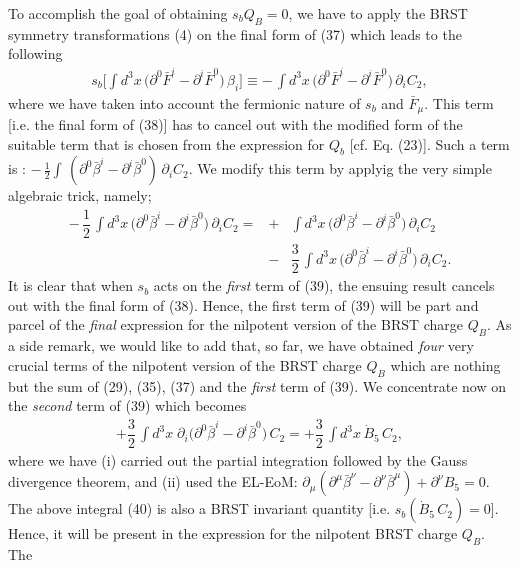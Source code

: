 \documentclass[12pt]{article}
\begin{document}
To accomplish the goal of obtaining $s_b Q_B = 0$, we have to apply the BRST symmetry transformations (4) on the final form of (37) which leads to
the following
\begin{eqnarray}\label{38} 
s_b \Big [\int d^3 x\, \big (\partial^0 \bar F^i - \partial^i \bar F^0 \big )\, \beta_i \Big ] \equiv
-\, \int d^3 x\, \big (\partial^0 \bar F^i - \partial^i \bar F^0 \big )\,\partial_i C_2,
\end{eqnarray}
where we have taken into account the fermionic nature of $s_b$ and $\bar F_\mu$. This term [i.e. the final form of (38)] has to cancel out
with the modified form of the suitable term that is chosen from the expression for $Q_b$ [cf. Eq. (23)]. Such a term is : $- \, \frac{1}{2} \int\,
(\partial^0 \bar \beta^i - \partial^i \bar \beta^0)\, \partial_i C_2$. We modify this term by applyig the 
very simple algebraic trick, namely; 
\begin{eqnarray}\label{39} 
-\, \dfrac{1}{2}\, \int d^3 x\, \big (\partial^0 \bar \beta^i - \partial^i \bar \beta^0\big )\,\partial_i C_2 =
&+& \int d^3 x\, \big (\partial^0 \bar \beta^i- \partial^i \bar \beta^0\big )\,\partial_i C_2 
\nonumber\\ &-& \dfrac{3}{2}\,
\int d^3 x\, \big (\partial^0 \bar \beta^i- \partial^i \bar \beta^0\big )\,\partial_i C_2.
\end{eqnarray}
It is clear that when $s_b$ acts on the {\it first} term of (39), the ensuing result cancels out with the final form of (38). Hence, the
first term of (39) will be part and parcel of the {\it final} expression for the nilpotent version of the BRST charge $Q_B$. As a side remark, we
would like to add that, so far,  we have obtained {\it four} very crucial terms of the nilpotent version of the BRST charge $Q_B$ which
are nothing but the sum of (29), (35), (37) and the {\it first} term of (39). We concentrate now on the {\it second} term of (39) which becomes 
\begin{eqnarray}\label{40} 
+ \dfrac{3}{2}\, \int d^3 x\; \partial_i \big (\partial^0 \bar \beta^i - \partial^i \bar \beta^0\big )\, C_2 = + \dfrac{3}{2}\,
\int d^3 x\, \dot B_5\, C_2,
\end{eqnarray}
where we have  (i) carried out the partial integration followed by the Gauss divergence theorem, and (ii) used the EL-EoM:
$\partial_\mu (\partial^\mu \bar \beta^\nu - \partial^\nu \bar \beta^\mu) + \partial^\nu B_5 = 0 $. The above integral (40) is also a
BRST invariant quantity [i.e. $s_b (\dot B_5 \,C_2) = 0 $]. Hence, it will be present in the expression for the nilpotent BRST charge $Q_B$. The
\end{document}
